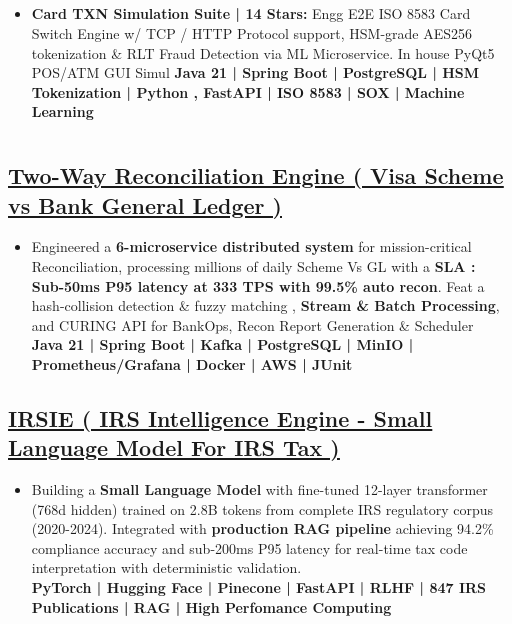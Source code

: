 \documentclass[11pt]{article}
\begin{document}
\subsection*{}
\begin{itemize}[itemsep=0.1ex,leftmargin=*,topsep=0pt]
  \item \textbf{Card TXN Simulation Suite | 14 Stars:} Engg E2E ISO 8583 Card Switch Engine w/ TCP / HTTP Protocol support, HSM-grade AES256 tokenization \& RLT Fraud Detection via ML Microservice. In house PyQt5 POS/ATM GUI Simul \textbf{Java 21 | Spring Boot | PostgreSQL | HSM Tokenization | Python , FastAPI | ISO 8583 | SOX | Machine Learning}
\end{itemize}

\section*{}

\subsection*{\uline{\href{https://github.com/davidgracemann/reconengine-visa}{Two-Way Reconciliation Engine ( Visa Scheme vs Bank General Ledger )}}}
\begin{itemize}[itemsep=0.1ex,leftmargin=*,topsep=0pt]
 \item Engineered a \textbf{6-microservice distributed system} for mission-critical Reconciliation, processing millions of daily Scheme Vs GL  with a \textbf{ SLA : Sub-50ms P95 latency at 333 TPS with 99.5\% auto recon}.
 Feat a hash-collision detection \& fuzzy matching , \textbf{Stream \& Batch Processing}, and CURING API for BankOps, Recon Report Generation \& Scheduler\\
 \textbf{Java 21 | Spring Boot | Kafka | PostgreSQL | MinIO | Prometheus/Grafana | Docker | AWS | JUnit}
\end{itemize}
\vspace{0.25em}

\subsection*{\uline{\href{https://github.com/davidgracemann/irsie}{IRSIE ( IRS Intelligence Engine - Small Language Model For IRS Tax )}}}
\begin{itemize}[itemsep=0.1ex,leftmargin=*,topsep=0pt]
\item Building a \textbf{Small Language Model} with fine-tuned 12-layer transformer (768d hidden) trained on 2.8B tokens from complete IRS regulatory corpus (2020-2024). 
Integrated with \textbf{production RAG pipeline} achieving 94.2\% compliance accuracy and sub-200ms P95 latency for real-time tax code interpretation with deterministic validation.\\
\textbf{PyTorch | Hugging Face | Pinecone | FastAPI | RLHF | 847 IRS Publications | RAG | High Perfomance Computing }
\end{itemize}
\vspace{0.25em}
\end{document}
